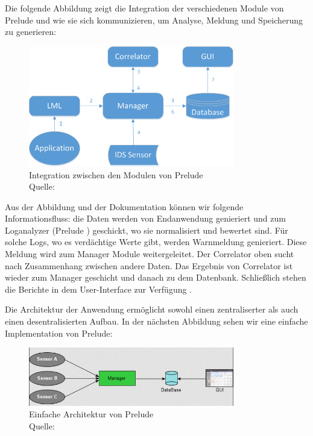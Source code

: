 Die folgende Abbildung zeigt die Integration der verschiedenen Module von Prelude und wie sie sich kommunizieren, um Analyse, Meldung und Speicherung zu generieren:

\begin{figure}[H]
   \centering
   \includegraphics[width=0.8\textwidth]{assets/2_p3.png}
   \caption{Integration zwischen den Modulen von Prelude \\Quelle: \citep{Prelude_MU} }
   \centering
\end{figure}

Aus der Abbildung und der Dokumentation können wir folgende Informationsfluss: die Daten werden von Endanwendung genieriert und zum Loganalyzer (Prelude ) geschickt, wo sie normalisiert und bewertet sind. Für solche Logs, wo es verdächtige Werte gibt, werden Warnmeldung genieriert. Diese Meldung wird zum Manager Module weitergeleitet. Der Correlator oben sucht nach Zusammenhang zwischen andere Daten. Das Ergebnis von Correlator ist wieder zum Manager geschicht und danach zu dem Datenbank. Schließlich stehen die Berichte in dem User-Interface zur Verfügung \citep{Prelude_Doc}.

Die Architektur der Anwendung ermöglicht sowohl einen zentraliserter als auch einen desentralisierten Aufbau. In der nächsten Abbildung sehen wir eine einfache Implementation von Prelude: 

\begin{figure}[H]
   \centering
   \includegraphics[width=0.8\textwidth]{assets/2_p4.png}
   \caption{Einfache Architektur von Prelude \\Quelle: \citep{Prelude_MU} }
   \centering
\end{figure}

